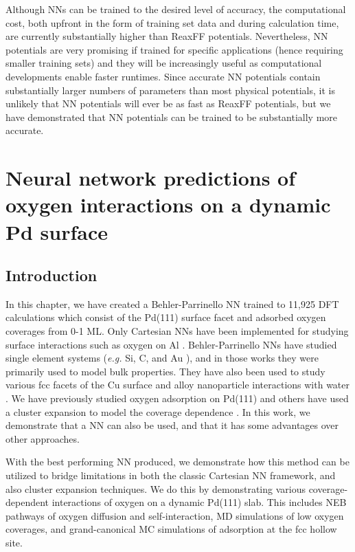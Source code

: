 \documentclass[12pt]{cmuthesis}
\begin{document}
Although NNs can be trained to the desired level of accuracy, the computational cost, both upfront in the form of training set data and during calculation time, are currently substantially higher than ReaxFF potentials. Nevertheless, NN potentials are very promising if trained for specific applications (hence requiring smaller training sets) and they will be increasingly useful as computational developments enable faster runtimes. Since accurate NN potentials contain substantially larger numbers of parameters than most physical potentials, it is unlikely that NN potentials will ever be as fast as ReaxFF potentials, but we have demonstrated that NN potentials can be trained to be substantially more accurate.

\chapter{Neural network predictions of oxygen interactions on a dynamic Pd surface}
\label{sec:ch5}
\section{Introduction}
\label{sec:org6ce3333}
In this chapter, we have created a Behler-Parrinello NN trained to 11,925 DFT calculations which consist of the Pd(111) surface facet and adsorbed oxygen coverages from 0-1 ML. Only Cartesian NNs have been implemented for studying surface interactions such as oxygen on Al \cite{behler-2007-repres-molec}. Behler-Parrinello NNs have studied single element systems (\emph{e.g.} Si, C, and Au \cite{behler-2008-metad-simul,eshet-2010-ab,boes-2016-neural-networ}), and in those works they were primarily used to model bulk properties. They have also been used to study various fcc facets of the Cu surface \cite{artrith-2012-high} and alloy nanoparticle interactions with water \cite{artrith-2015-grand-cu}. We have previously studied oxygen adsorption on Pd(111) \cite{kitchin-2009-correl-cover} and others have used a cluster expansion to model the coverage dependence \cite{frey-2014-implic-cover}. In this work, we demonstrate that a NN can also be used, and that it has some advantages over other approaches.

With the best performing NN produced, we demonstrate how this method can be utilized to bridge limitations in both the classic Cartesian NN framework, and also cluster expansion techniques. We do this by demonstrating various coverage-dependent interactions of oxygen on a dynamic Pd(111) slab. This includes NEB pathways \cite{henkelman-2000} of oxygen diffusion and self-interaction, MD simulations of low oxygen coverages, and grand-canonical MC simulations of adsorption at the fcc hollow site.
\end{document}
